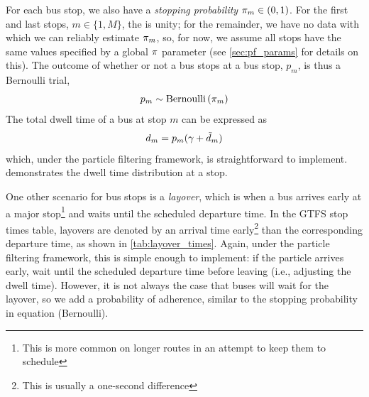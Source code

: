 For each bus stop, we also have a \emph{stopping probability} $\pi_m\in(0,1)$. For the first and last stops, $m\in\{1,M\}$, the is unity; for the remainder, we have no data with which we can reliably estimate $\pi_m$, so, for now, we assume all stops have the same values specified by a global $\pi$ parameter (see \cref{sec:pf_params} for details on this). The outcome of whether or not a bus stops at a bus stop, $p_m$, is thus a Bernoulli trial,
\begin{equation}
\label{eq:stop_pstop}
p_m \sim \mathrm{Bernoulli}\left(\pi_m\right)
\end{equation}
The total dwell time of a bus at stop $m$ can be expressed as
\begin{equation}
\label{eq:stop_total_dwell_time}
d_m = p_m (\gamma + \tilde d_m)
\end{equation}
which, under the particle filtering framework, is straightforward to implement.  demonstrates the dwell time distribution at a stop.

One other scenario for bus stops is a \emph{layover}, which is when a bus arrives early at a major stop\footnote{This is more common on longer routes in an attempt to keep them to schedule} and waits until the scheduled departure time. In the GTFS stop times table, layovers are denoted by an arrival time early\footnote{This is usually a one-second difference} than the corresponding departure time, as shown in \cref{tab:layover_times}. Again, under the particle filtering framework, this is simple enough to implement: if the particle arrives early, wait until the scheduled departure time before leaving (i.e., adjusting the dwell time). However, it is not always the case that buses will wait for the layover, so we add a probability of adherence, similar to the stopping probability in equation (Bernoulli).

